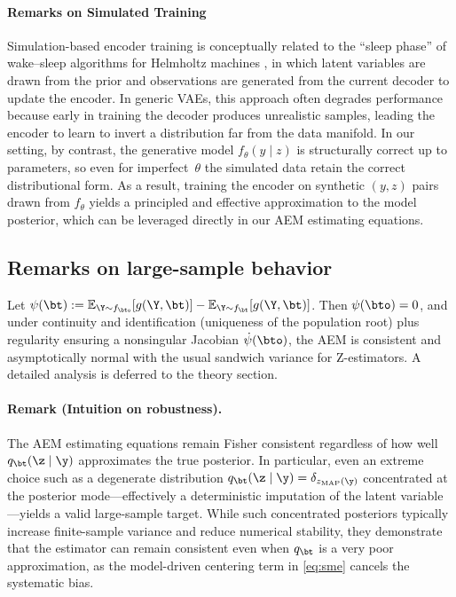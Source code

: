 \paragraph{Remarks on Simulated Training}

Simulation-based encoder training is conceptually related to the ``sleep phase'' of wake--sleep algorithms for Helmholtz machines \citep{hinton1995wake}, in which latent variables are drawn from the prior and observations are generated from the current decoder to update the encoder. In generic VAEs, this approach often degrades performance because early in training the decoder produces unrealistic samples, leading the encoder to learn to invert a distribution far from the data manifold. In our setting, by contrast, the generative model $f_\theta(y\mid z)$ is structurally correct up to parameters, so even for imperfect~$\theta$ the simulated data retain the correct distributional form. As a result, training the encoder on synthetic $(y,z)$ pairs drawn from $f_\theta$ yields a principled and effective approximation to the model posterior, which can be leveraged directly in our AEM estimating equations.


\subsection{Remarks on large-sample behavior}

Let $\psi(\bt):=\mathbb{E}_{\Y\sim f_{\bto}}[g(\Y,\bt)]-\mathbb{E}_{\Y\sim f_\bt}[g(\Y,\bt)]$.
Then $\psi(\bto)=0$, and under continuity and identification (uniqueness of the population root) plus regularity ensuring a nonsingular Jacobian $\dot\psi(\bto)$, the AEM is consistent and asymptotically normal with the usual sandwich variance for Z-estimators. A detailed analysis is deferred to the theory section.

\paragraph{Remark (Intuition on robustness).}
The AEM estimating equations remain Fisher consistent regardless of how well
$q_\bt(\z \mid \y)$ approximates the true posterior. 
In particular, even an extreme choice such as a degenerate distribution
$q_\bt(\z \mid \y) = \delta_{z_{\mathrm{MAP}}(\y)}$ concentrated at the 
posterior mode---effectively a deterministic imputation of the latent variable---yields
a valid large-sample target.
While such concentrated posteriors typically increase finite-sample variance and 
reduce numerical stability, they demonstrate that the estimator can remain
consistent even when $q_\bt$ is a very poor approximation, as the model-driven
centering term in \eqref{eq:sme} cancels the systematic bias.

